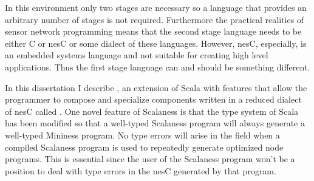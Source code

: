 In this environment only two stages are necessary so a language that provides an arbitrary
number of stages is not required. Furthermore the practical realities of sensor network
programming means that the second stage language needs to be either C or nesC
\cite{Gay-nesC-2003} or some dialect of these languages. However, nesC, especially, is an
embedded systems language and not suitable for creating high level applications. Thus the first
stage language can and should be something different.

In this dissertation I describe , an extension of Scala \cite{PiS2} with
features that allow the programmer to compose and specialize components written in a reduced
dialect of nesC called . One novel feature of Scalaness is that the type
system of Scala has been modified so that a well-typed Scalaness program will always generate a
well-typed Mininess program. No type errors will arise in the field when a compiled Scalaness
program is used to repeatedly generate optimized node programs. This is essential since the user
of the Scalaness program won't be a position to deal with type errors in the nesC generated by
that program.


